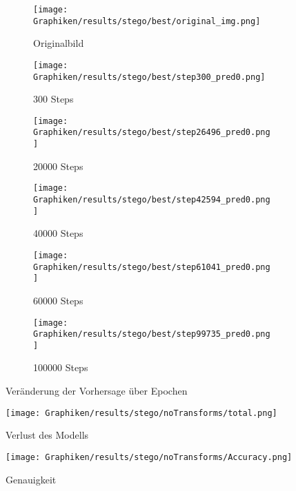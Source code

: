     \begin{figure}[h!]
        \begin{subfigure}[h]{0.3\linewidth}
            \texttt{[image: Graphiken/results/stego/best/original\_img.png]}
            \caption{ Originalbild}
        \end{subfigure}
        \hfill
        \begin{subfigure}[h]{0.3\linewidth}
            \texttt{[image: Graphiken/results/stego/best/step300\_pred0.png]}
            \caption{300 Steps}
        \end{subfigure}%
        \hfill
        \begin{subfigure}[h]{0.3\linewidth}
            \texttt{[image: Graphiken/results/stego/best/step26496\_pred0.png]}
            \caption{20000 Steps}
        \end{subfigure}%
        \hfill
        \begin{subfigure}[h]{0.3\linewidth}
            \texttt{[image: Graphiken/results/stego/best/step42594\_pred0.png]}
            \caption{40000 Steps}
        \end{subfigure}%
        \hfill
        \begin{subfigure}[h]{0.3\linewidth}
            \texttt{[image: Graphiken/results/stego/best/step61041\_pred0.png]}
            \caption{60000 Steps}
        \end{subfigure}%
        \hfill
        \begin{subfigure}[h]{0.3\linewidth}
            \texttt{[image: Graphiken/results/stego/best/step99735\_pred0.png]}
            \caption{100000 Steps}
        \end{subfigure}%
        \caption{Veränderung der Vorhersage über Epochen}
        \label{fig:stego_best_iter}
    \end{figure}

     
     
    \begin{figure}[h!]
        \centering
        \texttt{[image: Graphiken/results/stego/noTransforms/total.png]}
        \caption{Verlust des Modells}       
        \label{fig:stego_noTrans_loss}
    \end{figure}
    
    \begin{figure}[h!]
        \centering
        \texttt{[image: Graphiken/results/stego/noTransforms/Accuracy.png]}
        \caption{Genauigkeit}
        \label{fig:stego_nTrans_acc}
    \end{figure}
    
